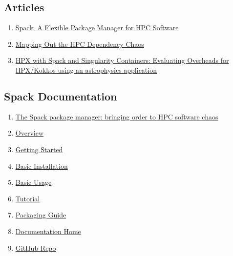 \documentclass[10pt, oneside]{article}   	%
\begin{document}
\subsection{Articles}
\begin{enumerate}
	\item \href{https://computing.llnl.gov/projects/spack-hpc-package-manager}{Spack: A Flexible Package Manager for HPC Software} 
	\item \href{https://arxiv.org/pdf/2211.05118}{Mapping Out the HPC Dependency Chaos}
	\item \href{https://arxiv.org/pdf/2405.00016}{HPX with Spack and Singularity Containers: Evaluating Overheads for HPX/Kokkos using an astrophysics application}
\end{enumerate}

\subsection{Spack Documentation}
\begin{enumerate}
	\item \href{https://dl-acm-org.libproxy.unm.edu/doi/10.1145/2807591.2807623}{The Spack package manager: bringing order to HPC software chaos}
	\item \href{https://computing.llnl.gov/projects/spack-hpc-package-manager}{Overview}
	\item \href{https://spack.readthedocs.io/en/latest/getting_started.html}{Getting Started}
	\item \href{https://spack-tutorial.readthedocs.io/en/latest/tutorial_basics.html}{Basic Installation}
	\item \href{https://spack.readthedocs.io/en/latest/basic_usage.html}{Basic Usage}
	\item \href{https://spack-tutorial.readthedocs.io/en/latest/}{Tutorial}
	\item \href{https://spack.readthedocs.io/en/latest/packaging_guide.html}{Packaging Guide}
	\item \href{https://spack.readthedocs.io/en/latest/}{Documentation Home}
	\item \href{https://github.com/spack/spacks}{GitHub Repo}
\end{enumerate}
\end{document}
